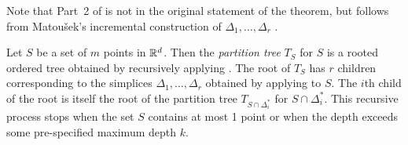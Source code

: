 \documentclass{patmorin}
\begin{document}
Note that Part~2 of  is not in the original
statement of the theorem, but follows from Matou\v{s}ek's incremental
construction of $\Delta_1,\ldots,\Delta_r$ \cite{m92}.

%
%
%

Let $S$ be a set of $m$ points in $\mathbb{R}^d$. Then the \emph{partition
tree} $T_S$ for $S$ is a rooted ordered tree obtained by recursively
applying .  The root of $T_S$ has $r$ children
corresponding to the simplices $\Delta_1,\ldots,\Delta_{r}$ obtained
by applying  to $S$. The $i$th child of the
root is itself the root of the partition tree $T_{S\cap\Delta_i^*}$
for $S\cap\Delta_i^*$. This recursive process stops when the set $S$
contains at most 1 point or when the depth exceeds some pre-specified
maximum depth $k$.
\end{document}
